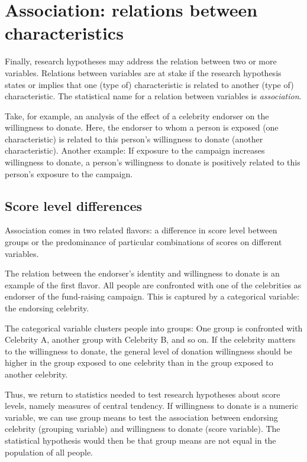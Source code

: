 \documentclass[a4paper]{book}
\theoremstyle{definition}
\theoremstyle{definition}
\theoremstyle{definition}
\theoremstyle{remark}
\begin{document}
\section*{Association: relations between
characteristics}\label{association-relations-between-characteristics}

Finally, research hypotheses may address the relation between two or
more variables. Relations between variables are at stake if the research
hypothesis states or implies that one (type of) characteristic is
related to another (type of) characteristic. The statistical name for a
relation between variables is \emph{association}.

Take, for example, an analysis of the effect of a celebrity endorser on
the willingness to donate. Here, the endorser to whom a person is
exposed (one characteristic) is related to this person's willingness to
donate (another characteristic). Another example: If exposure to the
campaign increases willingness to donate, a person's willingness to
donate is positively related to this person's exposure to the campaign.

\subsection*{Score level differences}\label{score-level-differences}

Association comes in two related flavors: a difference in score level
between groups or the predominance of particular combinations of scores
on different variables.

The relation between the endorser's identity and willingness to donate
is an example of the first flavor. All people are confronted with one of
the celebrities as endorser of the fund-raising campaign. This is
captured by a categorical variable: the endorsing celebrity.

The categorical variable clusters people into groups: One group is
confronted with Celebrity A, another group with Celebrity B, and so on.
If the celebrity matters to the willingness to donate, the general level
of donation willingness should be higher in the group exposed to one
celebrity than in the group exposed to another celebrity.

Thus, we return to statistics needed to test research hypotheses about
score levels, namely measures of central tendency. If willingness to
donate is a numeric variable, we can use group means to test the
association between endorsing celebrity (grouping variable) and
willingness to donate (score variable). The statistical hypothesis would
then be that group means are not equal in the population of all people.
\end{document}
